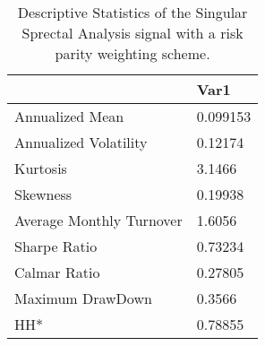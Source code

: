 \begin{table}[H]
\centering
\begin{tabular}{ll}
& Var1 \\ 
\hline 
Annualized Mean & 0.099153 \\ 
Annualized Volatility & 0.12174 \\ 
Kurtosis & 3.1466 \\ 
Skewness & 0.19938 \\ 
Average Monthly Turnover & 1.6056 \\ 
Sharpe Ratio & 0.73234 \\ 
Calmar Ratio & 0.27805 \\ 
Maximum DrawDown & 0.3566 \\ 
HH* & 0.78855 \\ 
\hline
\end{tabular}
\caption{Descriptive Statistics of the Singular Sprectal Analysis signal with a risk parity weighting scheme.}
\label{SSA_RP}
\end{table}